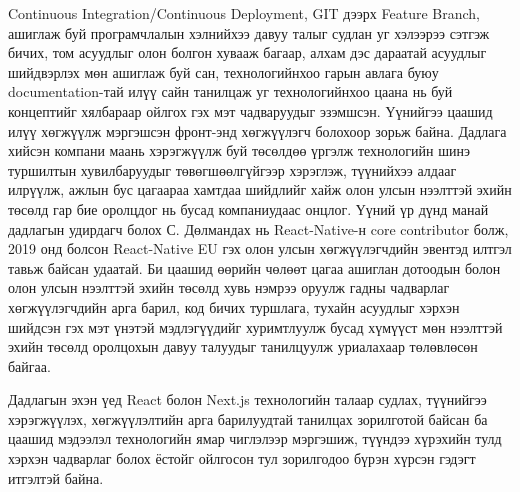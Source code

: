 \quad Continuous Integration/Continuous Deployment, GIT дээрх Feature Branch, ашиглаж буй програмчлалын хэлнийхээ давуу талыг судлан уг хэлээрээ сэтгэж бичих, том асуудлыг олон болгон хувааж багаар, алхам дэс дараатай асуудлыг шийдвэрлэх мөн ашиглаж буй сан, технологийнхоо гарын авлага буюу documentation-тай илүү сайн танилцаж уг технологийнхоо цаана нь буй концептийг хялбараар ойлгох гэх мэт чадваруудыг эзэмшсэн. Үүнийгээ цаашид илүү хөгжүүлж мэргэшсэн фронт-энд хөгжүүлэгч болохоор зорьж байна. Дадлага хийсэн компани маань хэрэгжүүлж буй төсөлдөө үргэлж технологийн шинэ туршилтын хувилбаруудыг төвөгшөөлгүйгээр хэрэглэж, түүнийхээ алдааг илрүүлж, ажлын бус цагаараа хамтдаа шийдлийг хайж олон улсын нээлттэй эхийн төсөлд гар бие оролцдог нь бусад компаниудаас онцлог. Үүний үр дүнд манай дадлагын удирдагч болох С. Дөлмандах нь React-Native-н core contributor болж, 2019 онд болсон React-Native EU гэх олон улсын хөгжүүлэгчдийн эвентэд илтгэл тавьж байсан удаатай. Би цаашид өөрийн чөлөөт цагаа ашиглан дотоодын болон олон улсын нээлттэй эхийн төсөлд хувь нэмрээ оруулж гадны чадварлаг хөгжүүлэгчдийн арга барил, код бичих туршлага, тухайн асуудлыг хэрхэн шийдсэн гэх мэт үнэтэй мэдлэгүүдийг хуримтлуулж бусад хүмүүст мөн нээлттэй эхийн төсөлд оролцохын давуу талуудыг танилцуулж уриалахаар төлөвлөсөн байгаа.

\quad Дадлагын эхэн үед React болон Next.js технологийн талаар судлах, түүнийгээ хэрэгжүүлэх, хөгжүүлэлтийн арга барилуудтай танилцах зорилготой байсан ба цаашид мэдээлэл технологийн ямар чиглэлээр мэргэшиж, түүндээ хүрэхийн тулд хэрхэн чадварлаг болох ёстойг ойлгосон тул зорилгодоо бүрэн хүрсэн гэдэгт итгэлтэй байна. 